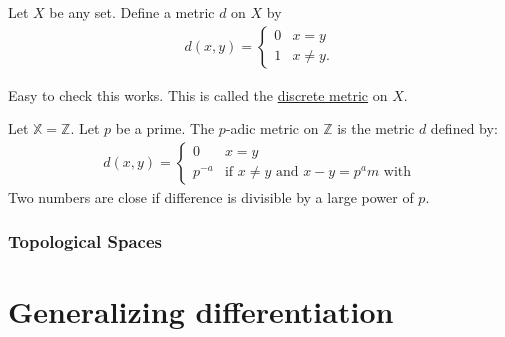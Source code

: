     \begin{example}
        Let $X$ be any set.
        Define a metric $d$ on $X$ by
        \begin{align*}
            d(x, y) = \begin{cases}
                0 & x = y \\
                1 & x \neq y.
            \end{cases} 
        \end{align*} 

        Easy to check this works.
        This is called the \underline{discrete metric} on $X$.
    \end{example} 

    \begin{example}
        Let $\mathbb{X} = \mathbb{Z}$.
        Let $p$ be a prime.
        The $p$-adic metric on $\mathbb{Z}$ is the metric $d$ defined by:
        \begin{align*}
            d(x, y) = \begin{cases}
                0 & x = y \\
                p^{-a} & \text{if $x \neq y$ and $x - y = p^a m$ with}
            \end{cases} 
        \end{align*} 
        Two numbers are close if difference is divisible by a large power of $p$.
    \end{example} 

    \section{Topological Spaces}
    \part{Generalizing differentiation}

